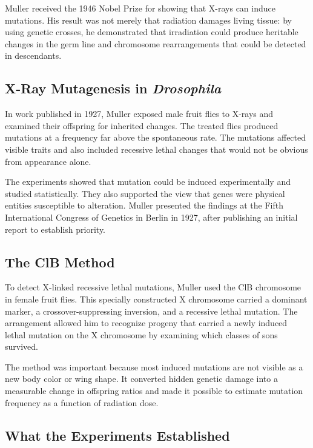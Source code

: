 Muller received the 1946 Nobel Prize for showing that X-rays can induce mutations. His result was not merely that radiation damages living tissue: by using genetic crosses, he demonstrated that irradiation could produce heritable changes in the germ line and chromosome rearrangements that could be detected in descendants.

\subsection{X-Ray Mutagenesis in \textit{Drosophila}}

In work published in 1927, Muller exposed male fruit flies to X-rays and examined their offspring for inherited changes. The treated flies produced mutations at a frequency far above the spontaneous rate. The mutations affected visible traits and also included recessive lethal changes that would not be obvious from appearance alone.

The experiments showed that mutation could be induced experimentally and studied statistically. They also supported the view that genes were physical entities susceptible to alteration. Muller presented the findings at the Fifth International Congress of Genetics in Berlin in 1927, after publishing an initial report to establish priority.

\subsection{The ClB Method}

To detect X-linked recessive lethal mutations, Muller used the ClB chromosome in female fruit flies. This specially constructed X chromosome carried a dominant marker, a crossover-suppressing inversion, and a recessive lethal mutation. The arrangement allowed him to recognize progeny that carried a newly induced lethal mutation on the X chromosome by examining which classes of sons survived.

The method was important because most induced mutations are not visible as a new body color or wing shape. It converted hidden genetic damage into a measurable change in offspring ratios and made it possible to estimate mutation frequency as a function of radiation dose.

\subsection{What the Experiments Established}

